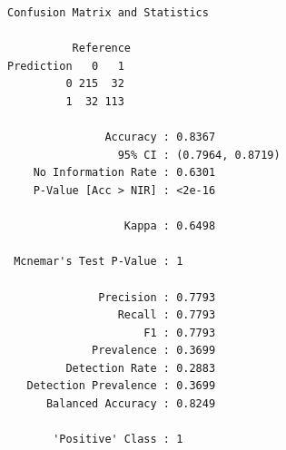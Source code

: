 \documentclass[
  letterpaper,
  DIV=11,
  numbers=noendperiod]{scrartcl}
\newenvironment{Shaded}{\begin{snugshade}}{\end{snugshade}}
\newcommand{\AttributeTok}[1]{\textcolor[rgb]{0.40,0.45,0.13}{#1}}
\newcommand{\FunctionTok}[1]{\textcolor[rgb]{0.28,0.35,0.67}{#1}}
\newcommand{\NormalTok}[1]{\textcolor[rgb]{0.00,0.23,0.31}{#1}}
\newcommand{\OtherTok}[1]{\textcolor[rgb]{0.00,0.23,0.31}{#1}}
\newcommand{\SpecialCharTok}[1]{\textcolor[rgb]{0.37,0.37,0.37}{#1}}
\newcommand{\StringTok}[1]{\textcolor[rgb]{0.13,0.47,0.30}{#1}}
\begin{document}
\begin{verbatim}
Confusion Matrix and Statistics

          Reference
Prediction   0   1
         0 215  32
         1  32 113
                                          
               Accuracy : 0.8367          
                 95% CI : (0.7964, 0.8719)
    No Information Rate : 0.6301          
    P-Value [Acc > NIR] : <2e-16          
                                          
                  Kappa : 0.6498          
                                          
 Mcnemar's Test P-Value : 1               
                                          
              Precision : 0.7793          
                 Recall : 0.7793          
                     F1 : 0.7793          
             Prevalence : 0.3699          
         Detection Rate : 0.2883          
   Detection Prevalence : 0.3699          
      Balanced Accuracy : 0.8249          
                                          
       'Positive' Class : 1               
                                          
\end{verbatim}

\begin{Shaded}
\end{Shaded}
\end{document}
